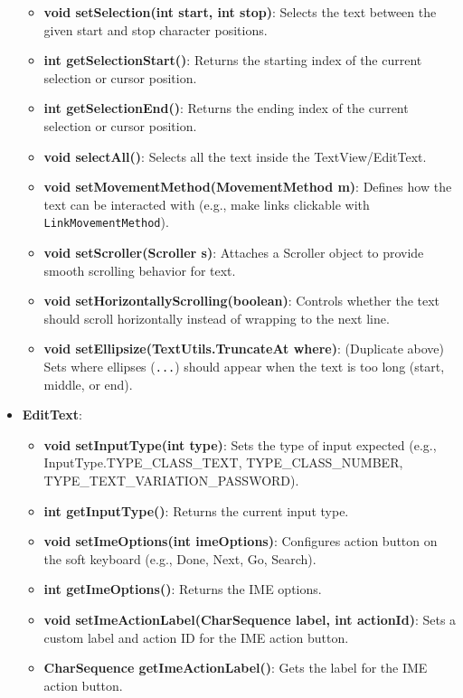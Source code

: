 \documentclass{report}
\begin{document}
\begin{itemize}
\begin{itemize}
                \item \textbf{void setSelection(int start, int stop)}: Selects the text between the given start and stop character positions.
                \item \textbf{int getSelectionStart()}: Returns the starting index of the current selection or cursor position.
                \item \textbf{int getSelectionEnd()}: Returns the ending index of the current selection or cursor position.
                \item \textbf{void selectAll()}: Selects all the text inside the TextView/EditText.
                \item \textbf{void setMovementMethod(MovementMethod m)}: Defines how the text can be interacted with (e.g., make links clickable with \texttt{LinkMovementMethod}).
                \item \textbf{void setScroller(Scroller s)}: Attaches a Scroller object to provide smooth scrolling behavior for text.
                \item \textbf{void setHorizontallyScrolling(boolean)}: Controls whether the text should scroll horizontally instead of wrapping to the next line.
                \item \textbf{void setEllipsize(TextUtils.TruncateAt where)}: (Duplicate above) Sets where ellipses (\texttt{...}) should appear when the text is too long (start, middle, or end).
            \end{itemize}
        \item \textbf{EditText}:
            \begin{itemize}
                \item \textbf{void setInputType(int type)}: Sets the type of input expected (e.g., InputType.TYPE\_CLASS\_TEXT, TYPE\_CLASS\_NUMBER, TYPE\_TEXT\_VARIATION\_PASSWORD).
                \item \textbf{int getInputType()}: Returns the current input type.
                \item \textbf{void setImeOptions(int imeOptions)}: Configures action button on the soft keyboard (e.g., Done, Next, Go, Search).
                \item \textbf{int getImeOptions()}: Returns the IME options.
                \item \textbf{void setImeActionLabel(CharSequence label, int actionId)}: Sets a custom label and action ID for the IME action button.
                \item \textbf{CharSequence getImeActionLabel()}: Gets the label for the IME action button.

\end{itemize}
\end{itemize}
\end{document}
